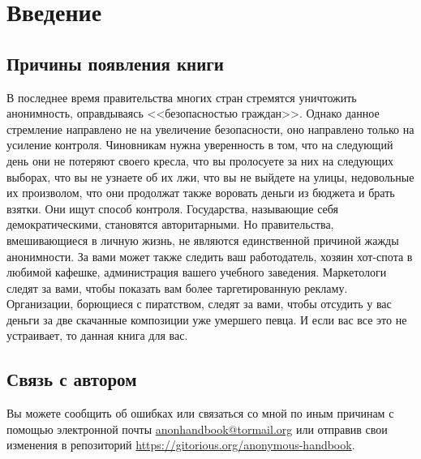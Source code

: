 \chapter*{Введение}
\section{Причины появления книги}
В последнее время правительства многих стран стремятся уничтожить анонимность, оправдываясь <<безопасностью граждан>>. Однако данное стремление направлено не на увеличение безопасности, оно направлено только на усиление контроля. Чиновникам нужна уверенность в том, что на следующий день они не потеряют своего кресла, что вы пролосуете за них на следующих выборах, что вы не узнаете об их лжи, что вы не выйдете на улицы, недовольные их произволом, что они продолжат также воровать деньги из бюджета и брать взятки. Они ищут способ контроля. Государства, называющие себя демократическими, становятся авторитарными. Но правительства, вмешивающиеся в личную жизнь, не являются единственной причиной жажды анонимности. За вами может также следить ваш работодатель, хозяин хот-спота в любимой кафешке, администрация вашего учебного заведения. Маркетологи следят за вами, чтобы показать вам более таргетированную рекламу. Организации, борющиеся с пиратством, следят за вами, чтобы отсудить у вас деньги за две скачанные композиции уже умершего певца. И если вас все это не устраивает, то данная книга для вас.

\section{Связь с автором}
Вы можете сообщить об ошибках или связаться со мной по иным причинам с помощью электронной почты \href{mailto:anonhandbook@tormail.org}{anonhandbook@tormail.org} или отправив свои изменения в репозиторий \url{https://gitorious.org/anonymous-handbook}.